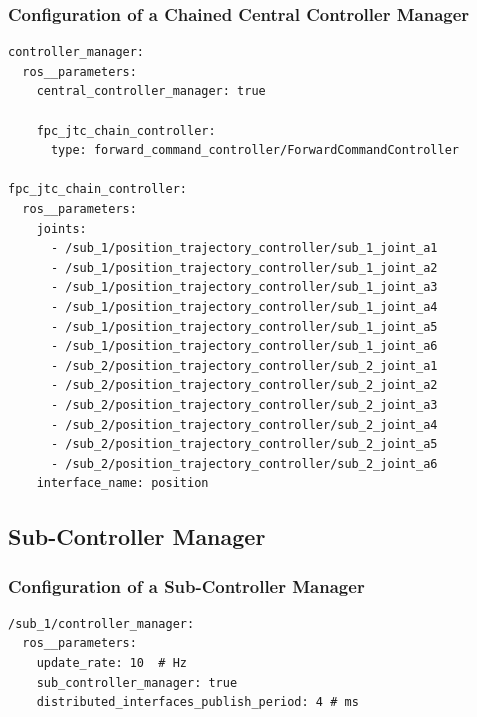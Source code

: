 \subsubsection{Configuration of a Chained Central Controller Manager}
\lstset{language=yaml,basicstyle=\scriptsize}
\begin{lstlisting}[caption=Example configuration of a chained central controller manager.,label=c5_l_chained_central_controller_manager_config]
controller_manager:
  ros__parameters:
    central_controller_manager: true

    fpc_jtc_chain_controller:
      type: forward_command_controller/ForwardCommandController

fpc_jtc_chain_controller:
  ros__parameters:
    joints:
      - /sub_1/position_trajectory_controller/sub_1_joint_a1
      - /sub_1/position_trajectory_controller/sub_1_joint_a2
      - /sub_1/position_trajectory_controller/sub_1_joint_a3
      - /sub_1/position_trajectory_controller/sub_1_joint_a4
      - /sub_1/position_trajectory_controller/sub_1_joint_a5
      - /sub_1/position_trajectory_controller/sub_1_joint_a6
      - /sub_2/position_trajectory_controller/sub_2_joint_a1
      - /sub_2/position_trajectory_controller/sub_2_joint_a2
      - /sub_2/position_trajectory_controller/sub_2_joint_a3
      - /sub_2/position_trajectory_controller/sub_2_joint_a4
      - /sub_2/position_trajectory_controller/sub_2_joint_a5
      - /sub_2/position_trajectory_controller/sub_2_joint_a6
    interface_name: position
\end{lstlisting}

\subsection{Sub-Controller Manager}

\subsubsection{Configuration of a Sub-Controller Manager}
\lstset{language=yaml,basicstyle=\scriptsize}
\begin{lstlisting}[caption=Example configuration of a sub-controller manager which exports all of it's command and state interfaces.,label=c5_l_sub_controller_manager_config]
/sub_1/controller_manager:
  ros__parameters:
    update_rate: 10  # Hz
    sub_controller_manager: true
    distributed_interfaces_publish_period: 4 # ms
\end{lstlisting}

